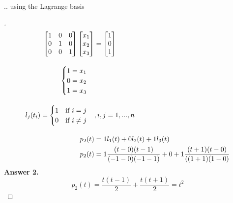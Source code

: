 \documentclass[12pt]{article}
\newenvironment{exercise}[2][Exercise]{\begin{trivlist}
\item[\hskip \labelsep {\bfseries #1}\hskip \labelsep {\bfseries #2.}]}{\end{trivlist}}
\begin{document}
\begin{exercise}{2}
... using the Lagrange basis
\end{exercise} \vspace{-10mm}
\begin{proof}[]
	\begin{align*}
		\begin{bmatrix}	1 & 0 & 0 \\ 0 & 1 & 0 \\ 0 & 0 & 1	\end{bmatrix}
		\begin{bmatrix}	x_1 \\ x_2 \\ x_3 \end{bmatrix}
		&= \begin{bmatrix} 1 \\ 0 \\ 1	\end{bmatrix} \\[10pt]
		\begin{cases}
		1 = x_1 \\
		0 = x_2 \\
		1 = x_3
		\end{cases} \\[10pt]
		l_j(t_i) = \begin{cases}	1 \quad \textnormal{if } i = j \\ 0 \quad \textnormal{if } i \neq j \end{cases}&, i,j = 1, ..., n \\[10pt]
		p_{2}(t) &= 1 l_1(t) + 0 l_2(t) + 1 l_3(t)\\
		p_2(t) &= 1\frac{(t-0)(t-1)}{(-1 - 0)(-1 - 1)} + 0 + 1\frac{(t+1)(t-0)}{((1+1)(1-0)}\\	
	\end{align*}
	\textbf{Answer 2.} \vspace{-7mm} \\
		\[ p_{2}(t) = \frac{t(t-1)}{2} + \frac{t(t+1)}{2} \boxed{= t^2} \]
\end{proof}
\end{document}
